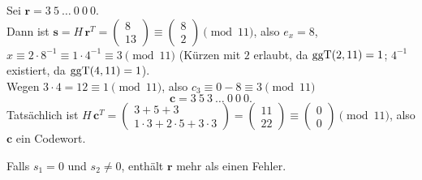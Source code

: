\begin{beispiel}
Sei $\mathbf{r} = 3\ 5\ \dots\ 0\ 0\ 0$.\\
Dann ist $\mathbf{s} = H\,\mathbf{r}^T = \begin{pmatrix} 8\\ 13 \end{pmatrix} \equiv \begin{pmatrix} 8\\ 2 \end{pmatrix} \pmod{11}$, also $e_x = 8$,
$x \equiv 2 \cdot 8^{-1} \equiv 1 \cdot 4^{-1} \equiv 3 \pmod{11}$
(Kürzen mit $2$ erlaubt, da $\operatorname{ggT}(2, 11) = 1$; $4^{-1}$ existiert, da $\operatorname{ggT}(4, 11) = 1$).\\
Wegen $3 \cdot 4 = 12 \equiv 1 \pmod{11}$, also $c_3 \equiv 0 - 8 \equiv 3 \pmod{11}$
\[ \mathbf{c} = 3\ 5\ 3\ \dots\ 0\ 0\ 0. \]
Tatsächlich ist $H\,\mathbf{c}^T = \begin{pmatrix} 3+5+3\\ 1\cdot 3 + 2\cdot 5 + 3\cdot 3 \end{pmatrix} = \begin{pmatrix} 11\\ 22 \end{pmatrix} \equiv \begin{pmatrix} 0\\ 0 \end{pmatrix} \pmod{11}$, also $\mathbf{c}$ ein Codewort.
\end{beispiel}

\begin{bemerkung}
Falls $s_1 = 0$ und $s_2 \neq 0$, enthält $\mathbf{r}$ mehr als einen Fehler.
\end{bemerkung}
